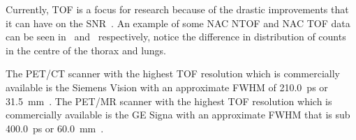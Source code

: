                 Currently, \gls{TOF} is a focus for research because of the drastic improvements that it can have on the \gls{SNR}~. %
                An example of some \gls{NAC} \gls{NTOF} and \gls{NAC} \gls{TOF} data can be seen in~ and~ respectively, notice the difference in distribution of counts in the centre of the thorax and lungs.
                
                The \gls{PET}/\gls{CT} scanner with the highest \gls{TOF} resolution which is commercially available is the Siemens Vision with an approximate \gls{FWHM} of \SI{210.0}{\pico\second} or \SI{31.5}{\milli\metre}~. The \gls{PET}/\gls{MR} scanner with the highest \gls{TOF} resolution which is commercially available is the \gls{GE} Signa with an approximate \gls{FWHM} that is sub \SI{400.0}{\pico\second} or \SI{60.0}{\milli\metre}~. %
            
